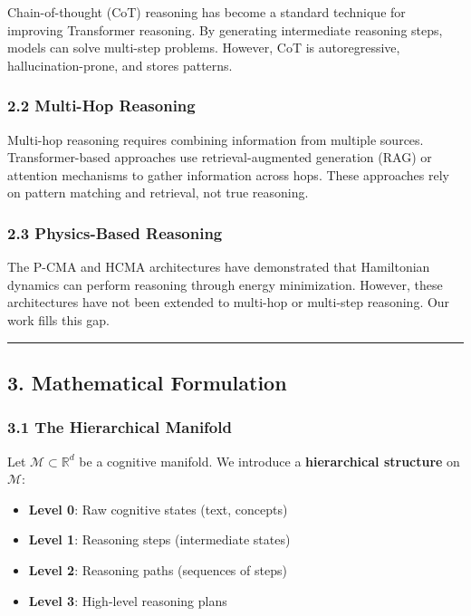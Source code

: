 \documentclass[
  11pt,
  a4paper,
]{article}
\providecommand{\tightlist}{%
  \setlength{\itemsep}{0pt}\setlength{\parskip}{0pt}}
\begin{document}
Chain-of-thought (CoT) reasoning has become a standard technique for
improving Transformer reasoning. By generating intermediate reasoning
steps, models can solve multi-step problems. However, CoT is
autoregressive, hallucination-prone, and stores patterns.

\subsubsection{2.2 Multi-Hop Reasoning}\label{multi-hop-reasoning}

Multi-hop reasoning requires combining information from multiple
sources. Transformer-based approaches use retrieval-augmented generation
(RAG) or attention mechanisms to gather information across hops. These
approaches rely on pattern matching and retrieval, not true reasoning.

\subsubsection{2.3 Physics-Based
Reasoning}\label{physics-based-reasoning}

The P-CMA and HCMA architectures have demonstrated that Hamiltonian
dynamics can perform reasoning through energy minimization. However,
these architectures have not been extended to multi-hop or multi-step
reasoning. Our work fills this gap.

\begin{center}\rule{0.5\linewidth}{0.5pt}\end{center}

\subsection{3. Mathematical Formulation}\label{mathematical-formulation}

\subsubsection{3.1 The Hierarchical
Manifold}\label{the-hierarchical-manifold}

Let \(\mathcal{M} \subset \mathbb{R}^d\) be a cognitive manifold. We
introduce a \textbf{hierarchical structure} on \(\mathcal{M}\):

\begin{itemize}
\tightlist
\item
  \textbf{Level 0}: Raw cognitive states (text, concepts)
\item
  \textbf{Level 1}: Reasoning steps (intermediate states)
\item
  \textbf{Level 2}: Reasoning paths (sequences of steps)
\item
  \textbf{Level 3}: High-level reasoning plans
\end{itemize}
\end{document}
